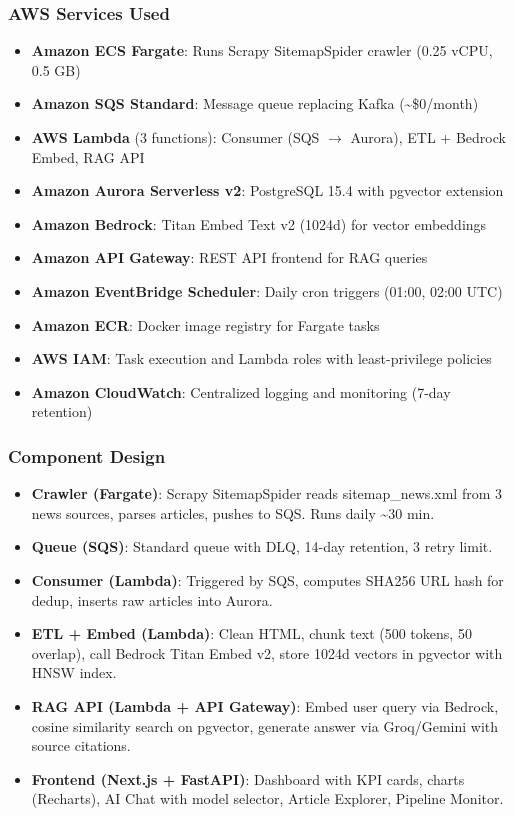 \hypertarget{aws-services-used}{%
\subsubsection{AWS Services Used}}

\begin{itemize}
\tightlist
\item
  \textbf{Amazon ECS Fargate}: Runs Scrapy SitemapSpider crawler (0.25
  vCPU, 0.5 GB)
\item
  \textbf{Amazon SQS Standard}: Message queue replacing Kafka
  (\textasciitilde\$0/month)
\item
  \textbf{AWS Lambda} (3 functions): Consumer (SQS \(\rightarrow\)
  Aurora), ETL + Bedrock Embed, RAG API
\item
  \textbf{Amazon Aurora Serverless v2}: PostgreSQL 15.4 with pgvector
  extension
\item
  \textbf{Amazon Bedrock}: Titan Embed Text v2 (1024d) for vector
  embeddings
\item
  \textbf{Amazon API Gateway}: REST API frontend for RAG queries
\item
  \textbf{Amazon EventBridge Scheduler}: Daily cron triggers (01:00,
  02:00 UTC)
\item
  \textbf{Amazon ECR}: Docker image registry for Fargate tasks
\item
  \textbf{AWS IAM}: Task execution and Lambda roles with least-privilege
  policies
\item
  \textbf{Amazon CloudWatch}: Centralized logging and monitoring (7-day
  retention)
\end{itemize}

\hypertarget{component-design}{%
\subsubsection{Component Design}}

\begin{itemize}
\tightlist
\item
  \textbf{Crawler (Fargate)}: Scrapy SitemapSpider reads
  sitemap\_news.xml from 3 news sources, parses articles, pushes to SQS.
  Runs daily \textasciitilde30 min.
\item
  \textbf{Queue (SQS)}: Standard queue with DLQ, 14-day retention, 3
  retry limit.
\item
  \textbf{Consumer (Lambda)}: Triggered by SQS, computes SHA256 URL hash
  for dedup, inserts raw articles into Aurora.
\item
  \textbf{ETL + Embed (Lambda)}: Clean HTML, chunk text (500 tokens, 50
  overlap), call Bedrock Titan Embed v2, store 1024d vectors in pgvector
  with HNSW index.
\item
  \textbf{RAG API (Lambda + API Gateway)}: Embed user query via Bedrock,
  cosine similarity search on pgvector, generate answer via Groq/Gemini
  with source citations.
\item
  \textbf{Frontend (Next.js + FastAPI)}: Dashboard with KPI cards,
  charts (Recharts), AI Chat with model selector, Article Explorer,
  Pipeline Monitor.
\end{itemize}

